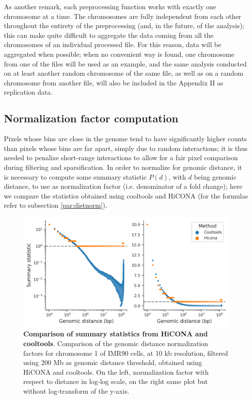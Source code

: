 As another remark, each preprocessing function works with exactly one chromosome at a time. The chromosomes are fully independent from each other throughout the entirety of the preprocessing (and, in the future, of the analysis); this can make quite difficult to aggregate the data coming from all the chromosomes of an individual processed file. For this reason, data will be aggregated when possible; when no convenient way is found, one chromosome from one of the files will be used as an example, and the same analysis conducted on at least another random chromosome of the same file, as well as on a random chromosome from another file, will also be included in the Appendix II as replication data.

\subsection{Normalization factor computation}

Pixels whose bins are close in the genome tend to have significantly higher counts than pixels whose bins are far apart, simply due to random interactions; it is thus needed to penalize short-range interactions to allow for a fair pixel comparison during filtering and sparsification. In order to normalize for genomic distance, it is necessary to compute some summary statistic $P(d)$, with $d$ being genomic distance, to use as normalization factor (i.e. denominator of a fold change); here we compare the statistics obtained using cooltools and HiCONA (for the formulas refer to subsection \ref{par:distnorm}). 

\begin{figure}[ht]
  \centering
  \includegraphics[width=1\textwidth]{hicona_vs_cooltools.png}
  \caption{\textbf{Comparison of summary statistics from HiCONA and cooltools}. Comparison of the genomic distance normalization factors for chromosome 1 of IMR90 cells, at 10 kb resolution, filtered using 200 Mb as genomic distance threshold, obtained using HiCONA and cooltools. On the left, normalization factor with respect to distance in log-log scale, on the right same plot but without log-transform of the y-axis.}
  \label{fig:cooltools}
\end{figure}

